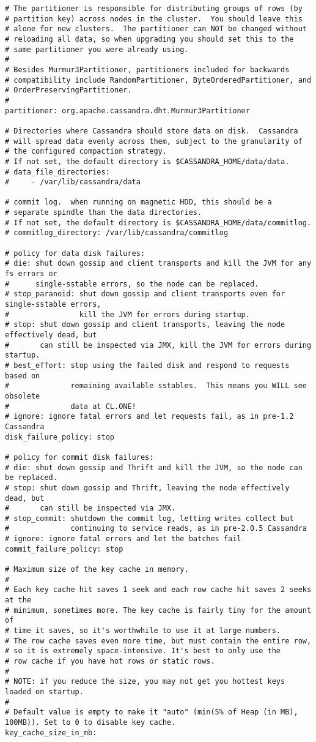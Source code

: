 \begin{verbatim}
# The partitioner is responsible for distributing groups of rows (by
# partition key) across nodes in the cluster.  You should leave this
# alone for new clusters.  The partitioner can NOT be changed without
# reloading all data, so when upgrading you should set this to the
# same partitioner you were already using.
#
# Besides Murmur3Partitioner, partitioners included for backwards
# compatibility include RandomPartitioner, ByteOrderedPartitioner, and
# OrderPreservingPartitioner.
#
partitioner: org.apache.cassandra.dht.Murmur3Partitioner

# Directories where Cassandra should store data on disk.  Cassandra
# will spread data evenly across them, subject to the granularity of
# the configured compaction strategy.
# If not set, the default directory is $CASSANDRA_HOME/data/data.
# data_file_directories:
#     - /var/lib/cassandra/data

# commit log.  when running on magnetic HDD, this should be a
# separate spindle than the data directories.
# If not set, the default directory is $CASSANDRA_HOME/data/commitlog.
# commitlog_directory: /var/lib/cassandra/commitlog

# policy for data disk failures:
# die: shut down gossip and client transports and kill the JVM for any fs errors or
#      single-sstable errors, so the node can be replaced.
# stop_paranoid: shut down gossip and client transports even for single-sstable errors,
#                kill the JVM for errors during startup.
# stop: shut down gossip and client transports, leaving the node effectively dead, but
#       can still be inspected via JMX, kill the JVM for errors during startup.
# best_effort: stop using the failed disk and respond to requests based on
#              remaining available sstables.  This means you WILL see obsolete
#              data at CL.ONE!
# ignore: ignore fatal errors and let requests fail, as in pre-1.2 Cassandra
disk_failure_policy: stop

# policy for commit disk failures:
# die: shut down gossip and Thrift and kill the JVM, so the node can be replaced.
# stop: shut down gossip and Thrift, leaving the node effectively dead, but
#       can still be inspected via JMX.
# stop_commit: shutdown the commit log, letting writes collect but
#              continuing to service reads, as in pre-2.0.5 Cassandra
# ignore: ignore fatal errors and let the batches fail
commit_failure_policy: stop

# Maximum size of the key cache in memory.
#
# Each key cache hit saves 1 seek and each row cache hit saves 2 seeks at the
# minimum, sometimes more. The key cache is fairly tiny for the amount of
# time it saves, so it's worthwhile to use it at large numbers.
# The row cache saves even more time, but must contain the entire row,
# so it is extremely space-intensive. It's best to only use the
# row cache if you have hot rows or static rows.
#
# NOTE: if you reduce the size, you may not get you hottest keys loaded on startup.
#
# Default value is empty to make it "auto" (min(5% of Heap (in MB), 100MB)). Set to 0 to disable key cache.
key_cache_size_in_mb:


\end{verbatim}
